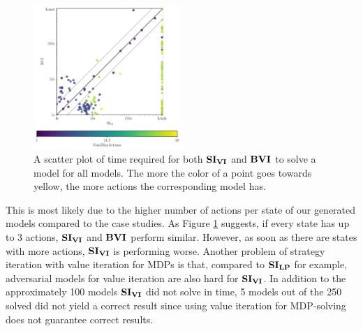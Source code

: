 \begin{figure}[h!]
    \centering
    \includegraphics[width=0.5\textwidth]{figures/colorScatter_SI_VI.pdf}
    \caption[$\SI$ compared to $\BVI$ based on MaxNumActions]{
        A scatter plot of time required for both $\SI$ and $\BVI$ to solve a model for all models.
        The more the color of a point goes towards yellow, the more actions the corresponding model has.
    }
    \label{fig:colorScatterSi}
\end{figure}
\FloatBarrier
This is most likely due to the higher number of actions per state of our generated models compared to the case studies.
As Figure \ref{fig:colorScatterSi} suggests, if every state has up to 3 actions, $\SI$ and $\BVI$ perform similar.
However, as soon as there are states with more actions, $\SI$ is performing worse.
Another problem of strategy iteration with value iteration for MDPs is that, compared to $\mathbf{SI_{LP}}$ for example, 
adversarial models for value iteration are also hard for $\SI$.
In addition to the approximately 100 models $\SI$ did not solve in time, 
5 models out of the 250 solved did not yield a correct result since using value iteration for MDP-solving does not guarantee correct results.

